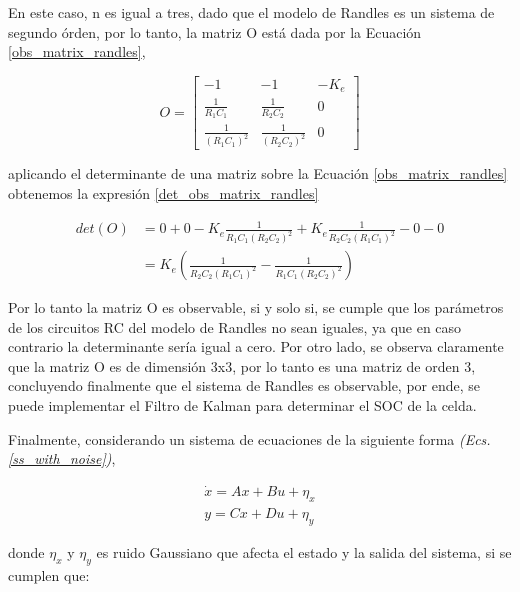 \documentclass[10pt,a4paper]{article}
\begin{document}
En este caso, n es igual a tres, dado que el modelo de Randles es un sistema de 
segundo \'orden, por lo tanto, la matriz O est\'a dada por la Ecuaci\'on 
\ref{obs_matrix_randles},

\begin{equation}
    O = \begin{bmatrix}
        -1 & -1 & -K_e \\
        \frac{1}{R_1C_1} & \frac{1}{R_2C_2} & 0 \\
        \frac{1}{\left(R_1C_1\right)^2} & \frac{1}{\left(R_2C_2\right)^2} & 0
        \end{bmatrix}\label{obs_matrix_randles}
\end{equation}

aplicando el determinante de una matriz sobre la Ecuaci\'on
\ref{obs_matrix_randles} obtenemos la expresi\'on \ref{det_obs_matrix_randles}

\begin{align}
    det\left(O\right) &= 0 + 0 -K_e \frac{1}{R_1C_1\left(R_2C_2\right)^2} + 
                        K_e \frac{1}{R_2C_2\left(R_1C_1\right)^2} - 0 -
                        0\nonumber\\
                      &= K_e \left(\frac{1}{R_2C_2\left(R_1C_1\right)^2} - 
                                   \frac{1}{R_1C_1\left(R_2C_2\right)^2}\right)
                                   \label{det_obs_matrix_randles}
\end{align}

Por lo tanto la matriz O es observable, si y solo si, se cumple que los
par\'ametros de los circuitos RC del modelo de Randles no sean iguales, ya que
en caso contrario la determinante ser\'ia igual a cero. Por otro lado, se observa
claramente que la matriz O es de dimensi\'on 3x3, por lo tanto es una matriz de
orden 3, concluyendo finalmente que el sistema de Randles es observable, por 
ende, se puede implementar el Filtro de Kalman para determinar el \acrshort{SOC} 
de la celda.

Finalmente, considerando un sistema de ecuaciones de la siguiente forma \emph{(Ecs.
\ref{ss_with_noise})},

\begin{align}
    \dot{x} = Ax + Bu + \eta_x\nonumber\\
    y = Cx + Du + \eta_y\label{ss_with_noise}
\end{align}

donde $\eta_x$ y $\eta_y$ es ruido Gaussiano que afecta el estado y la salida
del sistema, si se cumplen que:
\end{document}
